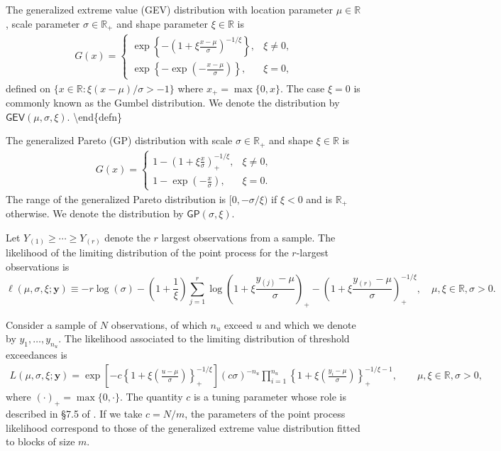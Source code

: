 \documentclass[]{book}
\begin{document}
The generalized extreme value (GEV) distribution with location parameter \(\mu \in \mathbb{R}\), scale parameter \(\sigma \in \mathbb{R}_{+}\) and shape
parameter \(\xi \in \mathbb{R}\) is
\begin{align*}
  G(x)  = 
\begin{cases}
\exp\left\{-\left(1+\xi \frac{x-\mu}{\sigma}\right)^{-1/\xi}\right\}, &  \xi \neq 0,\\
\exp \left\{ -\exp \left(-\frac{x-\mu}{\sigma}\right)\right\},&  \xi = 0,
\end{cases} 
 \end{align*}
defined on \(\{x \in \mathbb{R}: \xi(x-\mu)/\sigma > -1\}\) where \(x_{+} = \max\{0, x\}\). The case \(\xi=0\) is commonly known as the Gumbel
distribution.
We denote the distribution by \(\mathsf{GEV}(\mu, \sigma, \xi)\).
\textbackslash end\{defn\}

The generalized Pareto (GP) distribution with scale \(\sigma \in \mathbb{R}_{+}\) and shape \(\xi \in \mathbb{R}\) is
\begin{align*}
  G(x)  = 
\begin{cases}
1-\left(1+\xi \frac{x}{\sigma}\right)_{+}^{-1/\xi}, &  \xi \neq 0,\\ 1-
\exp \left(-\frac{x}{\sigma}\right),&  \xi = 0.
\end{cases}
 \end{align*}
The range of the generalized Pareto distribution is \([0, -\sigma/\xi)\) if \(\xi < 0\) and is \(\mathbb{R}_{+}\) otherwise. We denote the distribution
by \(\mathsf{GP}(\sigma, \xi)\).

Let \(Y_{(1)} \geq \cdots \geq Y_{(r)}\) denote the \(r\) largest observations from a sample. The likelihood of the limiting distribution of the point process for the \(r\)-largest observations is \[
\ell(\mu,\sigma,\xi; \boldsymbol{y}) \equiv  -r\log(\sigma) - \left(1+\frac{1}{\xi}\right)\sum_{j=1}^r \log\left(1 + \xi\frac{y_{(j)}-\mu}{\sigma}\right)_{+} - \left(1 + \xi\frac{y_{(r)}-\mu}{\sigma}\right)^{-1/\xi}_+, \quad \mu,\xi\in\mathbb{R}, \sigma>0.
\]

Consider a sample of \(N\) observations, of which \(n_u\) exceed \(u\) and which we denote by \(y_1, \ldots, y_{n_u}\). The likelihood associated to the limiting distribution of threshold exceedances is
\begin{align}
L(\mu, \sigma, \xi; \boldsymbol{y}) = \exp \left[ - c \left\{1+ \xi \left( \frac{u-\mu}{\sigma}\right)\right\}^{-1/\xi}_{+}\right] (c\sigma)^{-n_u}\prod_{i=1}^{n_u} \left\{1+\xi\left( \frac{y_i-\mu}{\sigma}\right)\right\}^{-1/\xi-1}_{+}, \qquad \mu, \xi \in \mathbb{R}, \sigma >0, \label{eq:ppp_lik}
\end{align}
where \((\cdot)_{+} = \max\{0, \cdot\}\). The quantity \(c\) is a tuning parameter whose role is described in \S 7.5 of \citet{Coles:2001}. If we take \(c=N/m\), the parameters of the point process likelihood correspond to those of the generalized extreme value distribution fitted to blocks of size \(m\).
\end{document}
